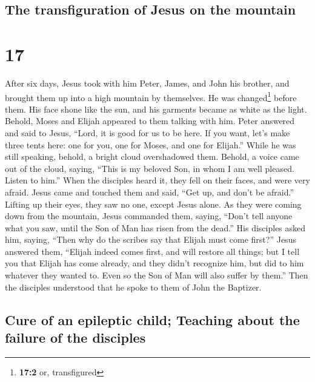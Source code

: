 \hypertarget{the-transfiguration-of-jesus-on-the-mountain}{%
\subsection{The transfiguration of Jesus on the
mountain}\label{the-transfiguration-of-jesus-on-the-mountain}}

\hypertarget{section-16}{%
\section{17}\label{section-16}}

 After six days, Jesus took with him Peter, James, and
John his brother, and brought them up into a high mountain by
themselves.  He was changed\footnote{\textbf{17:2} or,
  transfigured} before them. His face shone like the sun, and his
garments became as white as the light.  Behold, Moses and
Elijah appeared to them talking with him.  Peter answered
and said to Jesus, ``Lord, it is good for us to be here. If you want,
let's make three tents here: one for you, one for Moses, and one for
Elijah.''  While he was still speaking, behold, a bright
cloud overshadowed them. Behold, a voice came out of the cloud, saying,
``This is my beloved Son, in whom I am well pleased. Listen to him.''
 When the disciples heard it, they fell on their faces,
and were very afraid.  Jesus came and touched them and
said, ``Get up, and don't be afraid.''  Lifting up their
eyes, they saw no one, except Jesus alone.  As they were
coming down from the mountain, Jesus commanded them, saying, ``Don't
tell anyone what you saw, until the Son of Man has risen from the
dead.''  His disciples asked him, saying, ``Then why do
the scribes say that Elijah must come first?''  Jesus
answered them, ``Elijah indeed comes first, and will restore all things;
 but I tell you that Elijah has come already, and they
didn't recognize him, but did to him whatever they wanted to. Even so
the Son of Man will also suffer by them.''  Then the
disciples understood that he spoke to them of John the Baptizer.

\hypertarget{cure-of-an-epileptic-child-teaching-about-the-failure-of-the-disciples}{%
\subsection{Cure of an epileptic child; Teaching about the failure of
the
disciples}\label{cure-of-an-epileptic-child-teaching-about-the-failure-of-the-disciples}}

